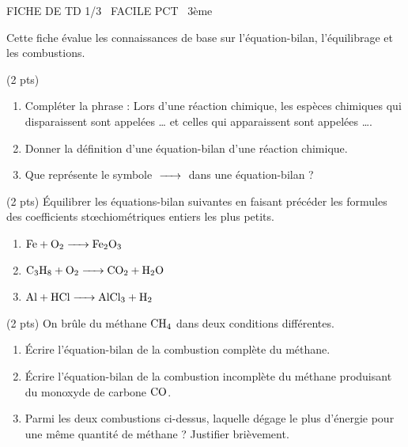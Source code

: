 \documentclass[11pt]{article}
\begin{document}
\begin{tcolorbox}[enhanced,colback=popink,colframe=popink,arc=10pt,boxrule=0pt,left=12pt,right=12pt,top=9pt,bottom=9pt]
{\color{white}\popxbold\small FICHE DE TD 1/3 \textbullet\ FACILE \hfill PCT \textbullet\ 3ème\par}
\end{tcolorbox}
\vspace{4pt}
Cette fiche évalue les connaissances de base sur l'équation-bilan, l'équilibrage et les combustions.

\begin{exercice} \hfill (2 pts)
\begin{enumerate}
    \item Compléter la phrase : Lors d'une réaction chimique, les espèces chimiques qui disparaissent sont appelées \ldots{} et celles qui apparaissent sont appelées \ldots{}.
    \item Donner la définition d'une équation-bilan d'une réaction chimique.
    \item Que représente le symbole $\ce{->}$ dans une équation-bilan ?
\end{enumerate}
\end{exercice}

\begin{exercice} \hfill (2 pts)
Équilibrer les équations-bilan suivantes en faisant précéder les formules des coefficients stœchiométriques entiers les plus petits.
\begin{enumerate}
    \item $\ce{Fe + O2 -> Fe2O3}$
    \item $\ce{C3H8 + O2 -> CO2 + H2O}$
    \item $\ce{Al + HCl -> AlCl3 + H2}$
\end{enumerate}
\end{exercice}

\begin{exercice} \hfill (2 pts)
On brûle du méthane $\ce{CH4}$ dans deux conditions différentes.
\begin{enumerate}
    \item Écrire l'équation-bilan de la combustion complète du méthane.
    \item Écrire l'équation-bilan de la combustion incomplète du méthane produisant du monoxyde de carbone $\ce{CO}$.
    \item Parmi les deux combustions ci-dessus, laquelle dégage le plus d'énergie pour une même quantité de méthane ? Justifier brièvement.
\end{enumerate}
\end{exercice}
\end{document}
